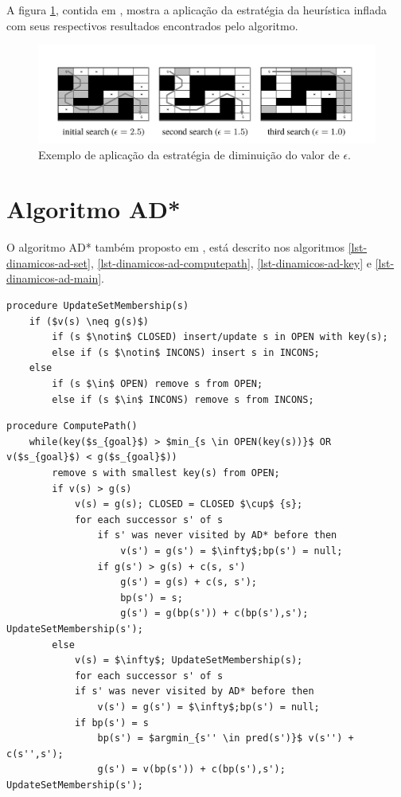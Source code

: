 A figura \ref{fig-ara-exemplo}, contida em , mostra a aplicação da estratégia da heurística inflada com seus respectivos resultados encontrados pelo algoritmo.

\begin{figure}[H]
\centering
\includegraphics[width=.80\textwidth]{figuras/ara-3} 
\caption{Exemplo de aplicação da estratégia de diminuição do valor de $\epsilon$.}
\label{fig-ara-exemplo}
\end{figure}
\section{Algoritmo AD*}
\label{sec-dinamicos-ad}

O algoritmo AD* também proposto em , está descrito nos algoritmos \ref{lst-dinamicos-ad-set}, \ref{lst-dinamicos-ad-computepath}, \ref{lst-dinamicos-ad-key} e \ref{lst-dinamicos-ad-main}.

\begin{lstlisting}[mathescape, label=lst-dinamicos-ad-set, caption=Algoritmo AD* - função para determinar o conjunto ao qual vértice pertencerá, float=htpb]
procedure UpdateSetMembership(s)
	if ($v(s) \neq g(s)$)
		if (s $\notin$ CLOSED) insert/update s in OPEN with key(s);
		else if (s $\notin$ INCONS) insert s in INCONS;
	else
		if (s $\in$ OPEN) remove s from OPEN;
		else if (s $\in$ INCONS) remove s from INCONS;
\end{lstlisting}

\begin{lstlisting}[mathescape, label=lst-dinamicos-ad-computepath, caption=Algoritmo AD* - função de cálculo de caminho, float=htpb]
procedure ComputePath()
	while(key($s_{goal}$) > $min_{s \in OPEN(key(s))}$ OR v($s_{goal}$) < g($s_{goal}$)) 
		remove s with smallest key(s) from OPEN;
		if v(s) > g(s)
			v(s) = g(s); CLOSED = CLOSED $\cup$ {s};
			for each successor s' of s
				if s' was never visited by AD* before then
					v(s') = g(s') = $\infty$;bp(s') = null;
				if g(s') > g(s) + c(s, s')
					g(s') = g(s) + c(s, s');
					bp(s') = s;
					g(s') = g(bp(s')) + c(bp(s'),s'); UpdateSetMembership(s');
		else
			v(s) = $\infty$; UpdateSetMembership(s);
			for each successor s' of s
			if s' was never visited by AD* before then
				v(s') = g(s') = $\infty$;bp(s') = null;
			if bp(s') = s
				bp(s') = $argmin_{s'' \in pred(s')}$ v(s'') + c(s'',s');
				g(s') = v(bp(s')) + c(bp(s'),s'); UpdateSetMembership(s');
\end{lstlisting}

